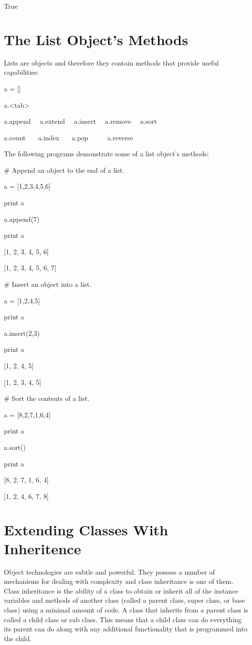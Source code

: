 \documentclass[12pt,oneside]{book}
\begin{document}
True

\section[The List Object's Methods]{ The List Object's Methods}

Lists are objects and therefore they contain methods that provide useful capabilities: 

a = []

a.{\textless}tab{\textgreater}

{\textbar}

a.append \ \ a.extend \ \ a.insert \ \ a.remove \ \ a.sort 

a.count \ \ \ a.index \ \ \ a.pop \ \ \ \ \ a.reverse 


The following programs demonstrate some of a list object's methods: 

\# Append an object to the end of a list.

a = [1,2,3,4,5,6]

print a

a.append(7)

print a

{\textbar}

[1, 2, 3, 4, 5, 6]

[1, 2, 3, 4, 5, 6, 7]


\# Insert an object into a list.

a = [1,2,4,5]

print a

a.insert(2,3)

print a

{\textbar}

[1, 2, 4, 5]

[1, 2, 3, 4, 5]

\# Sort the contents of a list.

a = [8,2,7,1,6,4]

print a

a.sort()

print a

{\textbar}

[8, 2, 7, 1, 6, 4]

[1, 2, 4, 6, 7, 8]

\section[Extending Classes With Inheritence]{ Extending Classes With Inheritence}

Object technologies are subtle and powerful. They possess a number of mechanisms for dealing with complexity and class inheritance is one of them. Class inheritance is the ability of a class to obtain or inherit all of the instance variables and methods of another class (called a parent class, super class, or base class) using a minimal amount of code. A class that inherits from a parent class is called a child class or sub class. This means that a child class can do everything its parent can do along with any additional functionality that is programmed into the child.  
\end{document}
